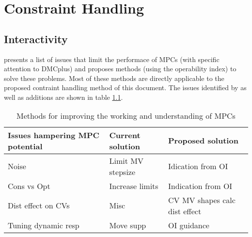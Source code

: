 \chapter{Constraint Handling}\label{chap:conhand}
\begin{overview}
\end{overview}

\section{Interactivity}
\citet{vinsonphd} presents a list of issues that limit the performace of MPCs
(with specific attention to DMCplus) and proposes methods (using the 
operability index) to solve these problems. Most of these methods are directly
applicable to the proposed contraint handling method of this document. The
issues identified by \citet{vinsonphd} as well as additions are shown in table
\ref{tab:mpcissues}.

\begin{table}[htbp]
  \caption[Methods for improving the working and understanding of MPCs]
    {Methods for improving the working and understanding of MPCs}
  \label{tab:mpcissues}
  \centering
  \begin{tabular}{p{5cm} p{5cm} p{5cm}}
    \toprule
    Issues hampering MPC potential & Current solution & Proposed solution \\
    \midrule
    Noise & Limit MV stepsize & Idication from OI \\
    Cons vs Opt & Increase limits & Indication from OI \\
    Dist effect on CVs & Misc & CV MV shapes calc dist effect \\
    Tuning dynamic resp & Move supp & OI guidance \\
    \bottomrule
  \end{tabular}
\end{table}